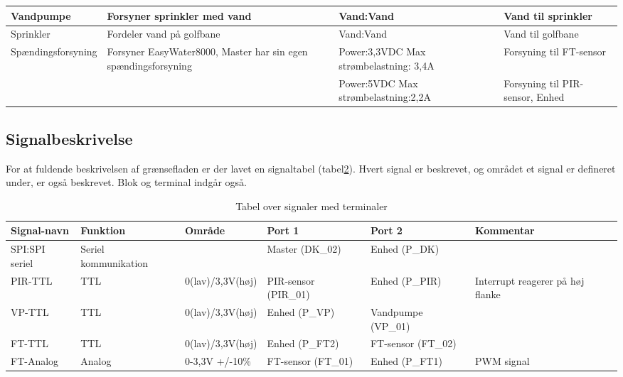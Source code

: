 \begin{table}[H]
\begin{small}
\begin{tabular}{|p{}|p{}|p{}|p{}|}
Vandpumpe & Forsyner sprinkler med vand & Vand:Vand & Vand til sprinkler \\ \hline
 
Sprinkler & Fordeler vand på golfbane & Vand:Vand & Vand til golfbane \\ \hline

Spændingsforsyning & Forsyner EasyWater8000, Master har sin egen spændingsforsyning & Power:3,3VDC \newline Max strømbelastning: 3,4A & Forsyning til FT-sensor \\ \cline{3-4}
& & Power:5VDC \newline Max strømbelastning:2,2A		& Forsyning til PIR-sensor, Enhed 	\\ \hline
\end{tabular}
\end{small}
\label{table:Bloktabel}
\end{table}

\begin{table}[H]
\subsection{Signalbeskrivelse}
For at fuldende beskrivelsen af grænsefladen er der lavet en signaltabel (tabel\ref{table:Signaltabel}). Hvert signal er beskrevet, og området et signal er defineret under, er også beskrevet. Blok og terminal indgår også. 
\caption{Tabel over signaler med terminaler}
\begin{small}
\begin{tabular}{|p{2cm}|p{2cm}|p{2cm}|p{2cm}|p{2cm}|p{}|}
\hline

\textbf{Signal-navn}	&\textbf{Funktion} 		&\textbf{Område} &\textbf{Port 1} 	&\textbf{Port 2} 			&\textbf{Kommentar} \\ \hline

SPI:SPI seriel 			&Seriel kommunikation 	& 				&Master (DK\_02)		&Enhed (P\_DK)			&					 \\\hline

PIR-TTL 					&TTL 					&0(lav)\slash3,3V(høj) 	&PIR-sensor (PIR\_01) &Enhed (P\_PIR)			&Interrupt reagerer på høj flanke 					\\\hline
VP-TTL 					&TTL 					&0(lav)\slash3,3V(høj) 	&Enhed (P\_VP)  &Vandpumpe (VP\_01)				&					\\\hline
					
FT-TTL					&TTL						&0(lav)\slash3,3V(høj) 	&Enhed (P\_FT2) &FT-sensor (FT\_02)				&	    				\\\hline
FT-Analog				&Analog 					&0-3,3V 	\newline +/-10\%	&FT-sensor (FT\_01) &Enhed (P\_FT1)				& PWM signal	    				\\\hline

\end{tabular}
\end{small}
\label{table:Signaltabel}
\end{table}